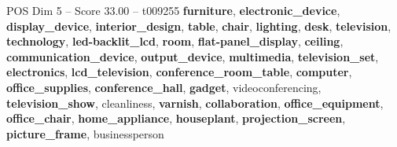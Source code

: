 \begin{textsample}{POS Dim 5 – Score 33.00 – t009255}  \label{ex:f5_pos_010}
\textbf{furniture}, \textbf{electronic\_device}, \textbf{display\_device}, \textbf{interior\_design}, \textbf{table}, \textbf{chair}, \textbf{lighting}, \textbf{desk}, \textbf{television}, \textbf{technology}, \textbf{led-backlit\_lcd}, \textbf{room}, \textbf{flat-panel\_display}, \textbf{ceiling}, \textbf{communication\_device}, \textbf{output\_device}, \textbf{multimedia}, \textbf{television\_set}, \textbf{electronics}, \textbf{lcd\_television}, \textbf{conference\_room\_table}, \textbf{computer}, \textbf{office\_supplies}, \textbf{conference\_hall}, \textbf{gadget}, videoconferencing, \textbf{television\_show}, cleanliness, \textbf{varnish}, \textbf{collaboration}, \textbf{office\_equipment}, \textbf{office\_chair}, \textbf{home\_appliance}, \textbf{houseplant}, \textbf{projection\_screen}, \textbf{picture\_frame}, businessperson

\end{textsample}

